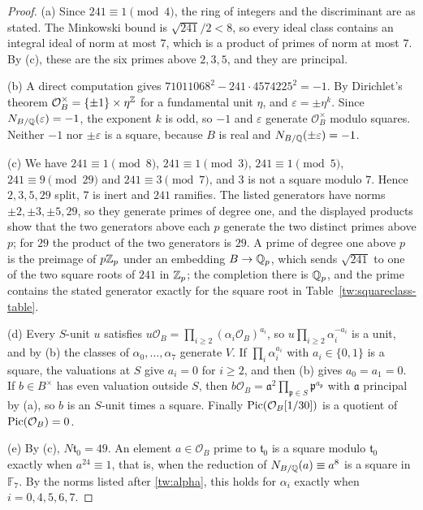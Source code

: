 \begin{proof}
(a) Since $241\equiv1\pmod 4$, the ring of integers and the discriminant are
as stated. The Minkowski bound is $\sqrt{241}/2<8$, so every ideal class
contains an integral ideal of norm at most $7$, which is a product of primes
of norm at most $7$. By (c), these are the six primes above $2,3,5$, and they
are principal.

(b) A direct computation gives $71011068^2-241\cdot4574225^2=-1$. By
Dirichlet's theorem $\mathcal O_B^\times=\{\pm1\}\times\eta^{\mathbb Z}$ for a
fundamental unit $\eta$, and $\varepsilon=\pm\eta^k$. Since
$N_{B/\mathbb Q}(\varepsilon)=-1$, the exponent $k$ is odd, so $-1$ and
$\varepsilon$ generate $\mathcal O_B^\times$ modulo squares. Neither $-1$ nor
$\pm\varepsilon$ is a square, because $B$ is real and
$N_{B/\mathbb Q}(\pm\varepsilon)=-1$.

(c) We have $241\equiv1\pmod8$, $241\equiv1\pmod3$, $241\equiv1\pmod5$,
$241\equiv9\pmod{29}$ and $241\equiv3\pmod7$, and $3$ is not a square modulo
$7$. Hence $2,3,5,29$ split, $7$ is inert and $241$ ramifies. The listed
generators have norms $\pm2,\pm3,\pm5,29$, so they generate primes of degree
one, and the displayed products show that the two generators above each $p$
generate the two distinct primes above $p$; for $29$ the product of the two
generators is $29$. A prime of degree one above $p$ is the preimage of
$p\mathbb Z_p$ under an embedding $B\to\mathbb Q_p$, which sends $\sqrt{241}$ to one of
the two square roots of $241$ in $\mathbb Z_p$; the completion there is $\mathbb Q_p$, and
the prime contains the stated generator exactly for the square root in
Table~\ref{tw:squareclass-table}.

(d) Every $S$-unit $u$ satisfies
$u\mathcal O_B=\prod_{i\ge2}(\alpha_i\mathcal O_B)^{a_i}$, so
$u\prod_{i\ge2}\alpha_i^{-a_i}$ is a unit, and by (b) the classes of
$\alpha_0,\dots,\alpha_7$ generate $V$. If $\prod_i\alpha_i^{a_i}$ with
$a_i\in\{0,1\}$ is a square, the valuations at $S$ give $a_i=0$ for $i\ge2$,
and then (b) gives $a_0=a_1=0$. If $b\in B^\times$ has even valuation outside
$S$, then
$b\mathcal O_B=\mathfrak a^2\prod_{\mathfrak p\in S}\mathfrak p^{a_{\mathfrak p}}$
with $\mathfrak a$ principal by (a), so $b$ is an $S$-unit times a square.
Finally $\operatorname{Pic}(\mathcal O_B[1/30])$ is a quotient of $\operatorname{Pic}(\mathcal O_B)=0$.

(e) By (c), $N\mathfrak t_0=49$. An element $a\in\mathcal O_B$ prime to
$\mathfrak t_0$ is a square modulo $\mathfrak t_0$ exactly when
$a^{24}\equiv1$, that is, when the reduction of $N_{B/\mathbb Q}(a)\equiv a^8$ is a
square in $\mathbb F_7$. By the norms listed after \eqref{tw:alpha}, this
holds for $\alpha_i$ exactly when $i=0,4,5,6,7$.
\end{proof}

